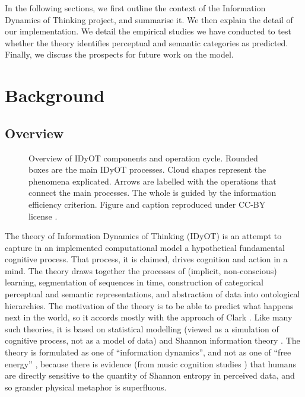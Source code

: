 \documentclass[runningheads]{llncs}
\begin{document}
In the following sections, we first outline the context of the Information Dynamics of Thinking project, and summarise it. We then explain the detail of our implementation. We detail the empirical studies we have conducted to test whether the theory identifies perceptual and semantic categories as predicted. Finally, we discuss the prospects for future work on the model.
\section{Background}
\subsection{Overview}
\begin{figure}[t]
    \centering
    \caption{Overview of IDyOT components and operation cycle. Rounded boxes are the main IDyOT processes. Cloud shapes represent the phenomena explicated. Arrows are labelled with the operations that connect the main processes. The whole is guided by the information efficiency criterion. Figure and caption reproduced under CC-BY license \cite{WigginsSanjekdar19}.}
    \label{fig:IDyOToverview}
\end{figure}
The theory of Information Dynamics of Thinking (IDyOT) is an attempt to capture in an implemented computational model a hypothetical fundamental cognitive process. That process, it is claimed, drives cognition and action in a mind. The theory draws together the processes of (implicit, non-conscious) learning, segmentation of sequences in time, construction of categorical perceptual and semantic representations, and abstraction of data into ontological hierarchies. The motivation of the theory is to be able to predict what happens next in the world, so it accords mostly with the approach of Clark \cite{Clark13}. Like many such theories, it is based on statistical modelling (viewed as a simulation of cognitive process, not as a model of data) and Shannon information theory \citep{Shannon48}. The theory is formulated as one of ``information dynamics'', and not as one of ``free energy''  \citep{Friston10}, because there is evidence (from music cognition studies  \citep{Huron06,PearceWiggins12,HansenPearce14}) that humans are directly sensitive to the quantity of Shannon entropy in perceived data, and so  grander physical metaphor is superfluous.
\end{document}
